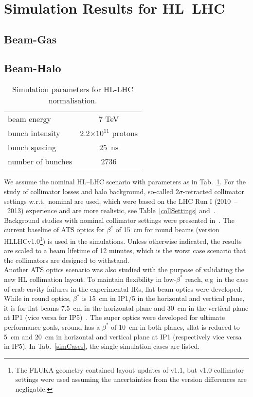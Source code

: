 \section{Simulation Results for HL--LHC}

\subsection{Beam-Gas}
\subsection{Beam-Halo }
\begin{table}%
   \centering
   \caption{Simulation parameters for HL-LHC normalisation.}
   \begin{tabular}{l|c}
       \hline
       beam energy & 7 TeV \\
       bunch intensity & 2.2$\times 10^{11}$ protons\\
       bunch spacing & 25~ns \\
       number of bunches & 2736 \\
       \hline
   \end{tabular}
   \label{hlscenario}
\end{table}


We assume the nominal HL--LHC scenario with parameters as in Tab.~\ref{hlscenario}. For the study of collimator losses and halo background, so-called 2$\sigma$-retracted collimator settings w.r.t.~nominal are used, which were based on the LHC Run I (2010~--~2013) experience and are more realistic, see Table~\ref{collSettings} and~\cite{collSettRef}. Background studies with nominal collimator settings were presented in~\cite{lastyear}. The current baseline of ATS optics for $\beta^{*}$ of 15~cm for round beams (version HLLHCv1.0\footnote{The FLUKA geometry contained layout updates of v1.1, but v1.0 collimator settings were used assuming the uncertainties from the version differences are negligable.}) is used in the simulations.  Unless otherwise indicated, the results are scaled to a beam lifetime of 12 minutes, which is the worst case scenario that the collimators are 
designed to withstand.\\
Another ATS optics scenario was also studied with the purpose of validating the new HL collimation layout. To maintain flexibility in low-$\beta^*$ reach, e.g~in the case of crab cavity failures in the experimental IRs, flat beam optics were developed. While in round optics, $\beta^*$ is 15~cm in IP1/5 in the horizontal and vertical plane, it is for flat beams 7.5~cm in the horizontal plane and 30~cm in the vertical plane at IP1 (vice versa for IP5)~\cite{opticsWebRef}. The super optics were developed for ultimate performance goals, sround has a $\beta^*$ of 10~cm in both planes, sflat is reduced to 5~cm and 20~cm in horizontal and vertical plane at IP1 (respectively vice versa in IP5). In Tab.~\ref{simCases}, the single simulation cases are listed.


